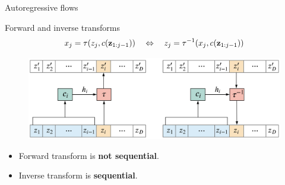 \begin{frame}{Autoregressive flows}
	\begin{block}{Forward and inverse transforms}
		\[
		x_j = \tau (z_j, c(\mathbf{z}_{1:j-1})) \quad \Leftrightarrow \quad z_j = \tau^{-1} (x_j, c(\mathbf{z}_{1:j-1}))
		\]
		\begin{figure}
			\includegraphics[width=\linewidth]{figs/autoregressive_flow}
		\end{figure}
	\end{block}
	\begin{itemize}
		\item Forward transform is \textbf{not sequential}.
		\item Inverse transform is \textbf{sequential}.
	\end{itemize}
	
\end{frame}
